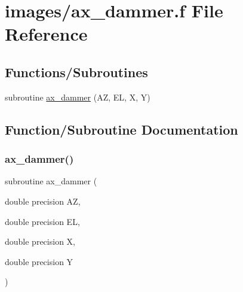 \hypertarget{ax__dammer_8f}{}\section{images/ax\+\_\+dammer.f File Reference}
\label{ax__dammer_8f}
\subsection*{Functions/\+Subroutines}
\begin{DoxyCompactItemize}
\item 
subroutine \hyperlink{ax__dammer_8f_ab176b0902c0dc6af174f9649593cffe8}{ax\+\_\+dammer} (AZ, EL, X, Y)
\end{DoxyCompactItemize}


\subsection{Function/\+Subroutine Documentation}
\mbox{\label{ax__dammer_8f_ab176b0902c0dc6af174f9649593cffe8}} 
\subsubsection{\texorpdfstring{ax\+\_\+dammer()}{ax\_dammer()}}
{\footnotesize\ttfamily subroutine ax\+\_\+dammer (\begin{DoxyParamCaption}\item[{double precision}]{AZ,  }\item[{double precision}]{EL,  }\item[{double precision}]{X,  }\item[{double precision}]{Y }\end{DoxyParamCaption})}

